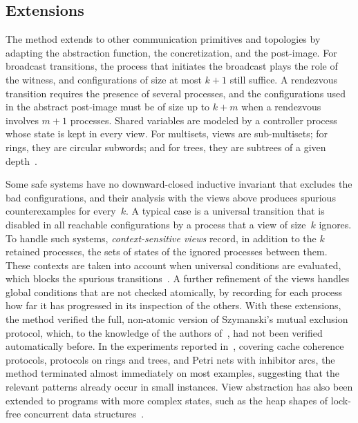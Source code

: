 \subsection{Extensions}

The method extends to other communication primitives and topologies by
adapting the abstraction function, the concretization, and the post-image.
For broadcast transitions, the process that initiates the broadcast plays the
role of the witness, and configurations of size at most $k+1$ still suffice.
A rendezvous transition requires the presence of several processes, and the
configurations used in the abstract post-image must be of size up to $k+m$
when a rendezvous involves $m+1$ processes. Shared variables are modeled by a controller process whose
state is kept in every view. For multisets, views are sub-multisets; for
rings, they are circular subwords; and for trees, they are subtrees of a given
depth~\cite{AHH16}.

Some safe systems have no downward-closed inductive invariant that excludes the bad
configurations, and their analysis with the views above produces spurious
counterexamples for every~$k$. A typical case is
a universal transition that is disabled in all reachable configurations by a
process that a view of size~$k$ ignores. To handle such systems,
\emph{context-sensitive views} record, in addition to the $k$ retained
processes, the sets of states of the ignored processes between them. These
contexts are taken into account when universal conditions are evaluated, which
blocks the spurious transitions~\cite{AHH14,AHH16}. A further refinement of the
views handles global conditions that are not checked atomically, by recording
for each process how far it has progressed in its inspection of the others.
With these extensions, the method verified the full, non-atomic version of
Szymanski's mutual exclusion protocol, which, to the knowledge of the authors
of~\cite{AHH16}, had not been verified automatically before.
In the experiments reported in~\cite{AHH16}, covering cache coherence
protocols, protocols on rings and trees, and Petri nets with inhibitor
arcs, the method terminated almost immediately on most examples,
suggesting that the relevant patterns already occur in small instances.
View abstraction has also been extended to programs with more complex
states, such as the heap shapes of lock-free concurrent data
structures~\cite{AHHJR17}.


